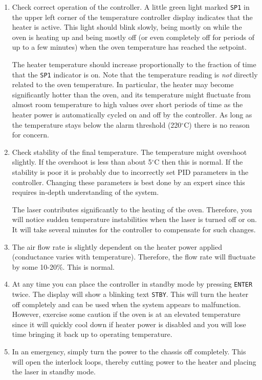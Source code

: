 \begin{enumerate}
\item Check correct operation of the controller. A little green 
  light marked {\tt SP1} in the upper left corner of the 
  temperature controller display indicates that the heater is active.
  This light should blink slowly, being mostly on while the oven is heating
  up and being mostly off (or even completely off for periods of up
  to a few minutes) when the oven temperature has reached the setpoint.

  The heater temperature should increase proportionally to the
  fraction of time that the {\tt SP1} indicator is on. 
  Note that the temperature reading is {\it not} directly related to the
  oven temperature. In particular, the heater may become significantly
  hotter than the oven, and its temperature 
  might fluctuate from almost room temperature
  to high values over short periods of time as the heater 
  power is automatically
  cycled on and off by the controller.  As long as the temperature 
  stays below the alarm threshold (220$^\circ$C) there is no reason 
  for concern.

\item Check stability of the final temperature. 
  The temperature might overshoot slightly. If the overshoot is
  less than about 5$^\circ$C then this is normal. If the stability is
  poor it is probably due to incorrectly set PID parameters in the controller. 
  Changing these parameters is best done by an expert since this requires
  in-depth understanding of the system.

  The laser contributes significantly to the heating of the oven.
  Therefore, you will notice sudden temperature instabilities when
  the laser is turned off or on. It will take several minutes for
  the controller to compensate for such changes.

\item The air flow rate is slightly dependent on the heater power
  applied (conductance varies with temperature). 
  Therefore, the flow rate will fluctuate by some 10-20\%. This is
  normal.


\item At any time you can place the controller in standby mode by pressing
  {\tt ENTER} twice. The display will show a blinking text {\tt STBY}.
  This will turn the heater off completely and can be used
  when the system appears to malfunction.   However, exercise some
  caution if the oven is at an elevated temperature since it will quickly 
  cool down if heater power is disabled and you will lose time bringing
  it back up to operating temperature.

\item In an emergency, simply turn the power to the chassis off completely.
  This will open the interlock loops, thereby cutting power to the heater
  and placing the laser in standby mode.

\end{enumerate}

